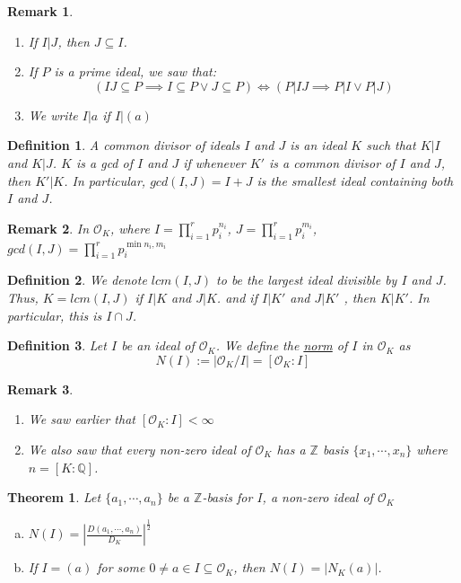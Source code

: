 \documentclass{article}
\newcommand{\air}{\mathcal{O}_K}
\newcommand{\Q}{\mathbb{Q}}
\newcommand{\Z}{\mathbb{Z}}
\newtheorem{theorem}{Theorem}[subsection]
\newtheorem{remark}{Remark}[subsection]
\newtheorem{definition}{Definition}[subsection]
\begin{document}
\begin{remark}
\begin{enumerate}
    \item If $I|J$, then $J\subseteq I$.
    \item If $P$ is a prime ideal, we saw that:
    $$(IJ\subseteq P\implies I\subseteq P \vee J\subseteq P)\iff (P|IJ\implies P|I\vee P|J) $$
    \item We write $I|a$ if $I|(a)$
    \end{enumerate}
\end{remark}
\begin{definition}
A common divisor of ideals $I$ and $J$ is an ideal $K$ such that $K|I$ and $K|J$. $K$ is a gcd of $I$ and $J$ if whenever $K'$ is a common divisor of $I$ and $J$, then $K'|K$. In particular, $gcd(I,J)=I+J$ is the smallest ideal containing both $I$ and $J$.
\end{definition}
\begin{remark}
In $\air$, where $I=\displaystyle\prod_{i=1}^r p_i^{n_i}$, $J=\displaystyle\prod_{i=1}^r p_i^{m_i}$, $gcd(I,J)=\displaystyle\prod_{i=1}^rp_i^{\min{n_i,m_i}}$
\end{remark}
\begin{definition}
We denote $lcm(I,J)$ to be the largest ideal divisible by $I$ and $J$. Thus, $K=lcm(I,J)$ if $I|K$ and $J|K$. and if $I|K'$ and $J|K'$ , then $K|K'$. In particular, this is $I\cap J$. 
\end{definition}
\begin{definition}
Let $I$ be an ideal of $\air$. We define the \underline{norm} of $I$ in $\air$ as 
$$N(I):=|\air/I|=[\air :I]$$
\end{definition}
\begin{remark}
\begin{enumerate}
    \item We saw earlier that $[\air : I]<\infty$
    \item We also saw that every non-zero ideal of $\air$ has a $\Z$ basis $\{x_1,\cdots, x_n\}$ where $n=[K:\Q]$.
\end{enumerate}
\end{remark}
\newpage
\begin{theorem}
Let $\{a_1, \cdots, a_n\}$ be a $\Z$-basis for $I$, a non-zero ideal of $\air$
\begin{enumerate}[a)]
    \item $N(I)=\left|\frac{D(a_1,\cdots, a_n)}{D_K}\right|^{\frac{1}{2}}$
    \item If $I=(a)$ for some $0\neq a\in I\subseteq \air$, then $N(I)=|N_K(a)|$.
\end{enumerate}
\end{theorem}
\end{document}

